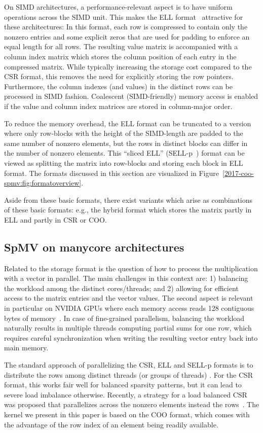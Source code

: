 On SIMD architectures, a performance-relevant aspect is to have uniform operations
across the SIMD unit. This makes the ELL format~\cite{garlandspmv} attractive for these architectures:
In this format, each row is compressed to contain only the nonzero entries 
and some explicit zeros that are used for padding to enforce
an equal length for all rows.
The resulting value matrix is accompanied with a column index matrix which stores
the column position of each entry in the compressed matrix.
While typically increasing the storage cost compared to the CSR format,
this removes the need for explicitly storing the row pointers.
Furthermore, the column indexes (and values) in the distinct
rows can be processed in SIMD fashion.
Coalescent (SIMD-friendly) memory access is enabled if the value and column
index matrices are stored in column-major order.

To reduce the memory overhead, the ELL format can be truncated to a version
where only row-blocks with the height of the SIMD-length are padded to the
same number of nonzero elements, but the rows in distinct blocks can differ in
the number of nonzero elements.
This ``sliced ELL'' (SELL-p~\cite{sellcs}) format can be viewed as splitting the matrix into row-blocks
and storing each block in ELL format.
The formats discussed in this section are visualized
in Figure~\ref{2017-coo-spmv:fig:formatoverview}.

Aside from these basic formats, there exist variants
which arise as combinations of these basic formats:
e.g., the hybrid format which stores the matrix partly in ELL and partly in
CSR or COO.


\subsection{SpMV on manycore architectures}

Related to the storage format is the question of how to process
the multiplication with a vector in parallel.
The main challenges in this context are: 
1) balancing the workload among the distinct cores/threads; and 
2) allowing for efficient access to the matrix entries and the vector values.
The second aspect is relevant in particular on NVIDIA GPUs where each memory access
reads 128 contiguous bytes of memory~\cite{cuda8.0}.
In case of fine-grained parallelism, balancing the workload naturally results in 
multiple threads computing partial sums for one row, which requires careful synchronization
when writing the resulting vector entry back into main memory.

The standard approach of parallelizing the CSR, ELL and SELL-p formats is to
distribute the rows among distinct threads (or groups of threads)
\cite{garlandspmv, sellc}.
For the CSR format, this works fair well for balanced sparsity patterns, but it can lead to
severe load imbalance otherwise. 
Recently, a strategy for a load balanced CSR \spmv was proposed that 
parallelizes across the nonzero elements instead the rows~\cite{csri}. 
The \spmv kernel we present in this paper is based on the COO format, which 
comes with the advantage of the row index of an element being readily available.
